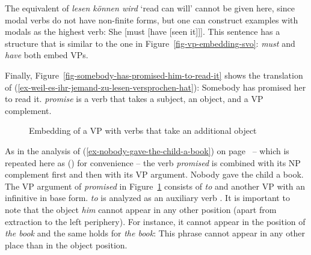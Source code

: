 The equivalent of \emph{lesen können wird} `read can will' cannot be given here, since  modal
verbs do not have non-finite forms, but one can construct examples with modals as the highest verb:
\ea
She [must [have [seen it]]].
\z
This sentence has a structure that is similar to the one in Figure~\ref{fig-vp-embedding-svo}:
\emph{must} and \emph{have} both embed VPs.

Finally, Figure~\vref{fig-somebody-has-promised-him-to-read-it} shows the translation of
(\ref{ex-weil-es-ihr-jemand-zu-lesen-versprochen-hat}):
\ea
Somebody has promised her to read it.
\z
\emph{promise} is a verb that takes a subject, an object, and a VP complement. 
\begin{figure}
\caption{\label{fig-somebody-has-promised-him-to-read-it}Embedding of a VP with verbs that take an
  additional object}
\end{figure}
As in the analysis of (\ref{ex-nobody-gave-the-child-a-book}) on
page~\pageref{ex-nobody-gave-the-child-a-book} -- which is repeated here as () for convenience
-- the verb \emph{promised} is combined with its NP complement first and then with its VP
argument.
\ea
\label{ex-nobody-gave-the-child-a-book-three}
Nobody gave the child a book.
\z 
The VP argument of \emph{promised} in Figure~\ref{fig-somebody-has-promised-him-to-read-it} consists of \emph{to} and another VP with an infinitive in base form. \emph{to} is
analyzed as an auxiliary verb \parencites[]{GPS82a-u}[]{Sag2020a}.
It is important to note that the object \emph{him} cannot appear in any other position (apart from
extraction to the left periphery). For instance, it cannot appear in the position of \emph{the book}
and the same holds for \emph{the book}: This phrase cannot appear in any other place than in the
object position.

